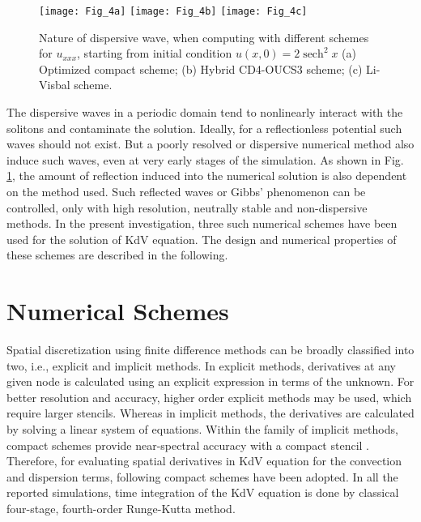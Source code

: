 \documentclass{svjour3}                    %
\DeclareMathOperator{\sech}{sech}
\begin{document}
\begin{figure}[h!]
\centerline{
\texttt{[image: Fig\_4a]}
\texttt{[image: Fig\_4b]}
\texttt{[image: Fig\_4c]}
}
\caption{Nature of dispersive wave, when computing with different schemes for $u_{xxx}$, starting from initial condition $u(x,0)=2\sech^2x$ (a) Optimized compact scheme; (b) Hybrid CD4-OUCS3 scheme; (c) Li-Visbal scheme.}
\label{fig:reflect3}
\end{figure}
The dispersive waves in a periodic domain tend to nonlinearly interact with the solitons and contaminate the solution. Ideally, for a reflectionless potential such waves should not exist. But a poorly resolved or dispersive numerical method also induce such waves, even at very early stages of the simulation. As shown in Fig. \ref{fig:reflect3}, the amount of reflection induced into the numerical solution is also dependent on the method used. 
Such reflected waves or Gibbs' phenomenon can be controlled, only with high resolution, neutrally stable and non-dispersive methods. In the present investigation, three such numerical schemes have been used for the solution of KdV equation. The design and numerical properties of these schemes are 
described in the following.

\section{Numerical Schemes}
\label{sec:num_sch}
Spatial discretization using finite difference methods can be broadly classified into two, i.e., explicit and implicit methods. In explicit methods, derivatives at any given node is calculated using an explicit expression in terms of the unknown. For better resolution and accuracy, higher order explicit methods may be used, which require larger stencils. Whereas in implicit methods, the derivatives are calculated by solving a linear system of equations. Within the family of implicit methods, compact schemes provide near-spectral accuracy with a compact stencil \cite{Sengupta2013a}. Therefore, for evaluating spatial derivatives in KdV equation for the convection and dispersion terms, following compact schemes have been adopted. In all the reported simulations, time integration of the KdV equation is done by classical four-stage, fourth-order Runge-Kutta method.

\end{document}
